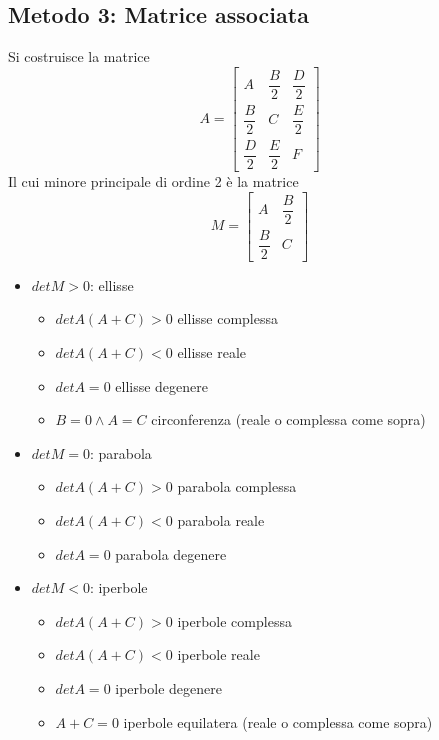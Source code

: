 \documentclass{article}
\begin{document}
\subsection*{Metodo 3: Matrice associata}
Si costruisce la matrice \[\renewcommand{\arraystretch}{2}A=\left[\begin{array}{ccc}
    A & \dfrac{B}{2} & \dfrac{D}{2}\\
    \dfrac{B}{2} & C & \dfrac{E}{2} \\
    \dfrac{D}{2} & \dfrac{E}{2} & F
\end{array}\right]\]
Il cui minore principale di ordine 2 è la matrice 
\[\renewcommand{\arraystretch}{2}M=\left[\begin{array}{cc}
    A & \dfrac{B}{2} \\
    \dfrac{B}{2} & C
\end{array}\right]\]
\begin{itemize}
    \item $detM>0$: ellisse
        \begin{itemize}
            \item $detA(A+C)>0$ ellisse complessa
            \item $detA(A+C)<0$ ellisse reale
            \item $detA=0$ ellisse degenere
            \item $B=0 \land A=C$ circonferenza (reale o complessa come sopra)
        \end{itemize}
    \item $detM=0$: parabola
        \begin{itemize}
            \item $detA(A+C)>0$ parabola complessa
            \item $detA(A+C)<0$ parabola reale
            \item $detA=0$ parabola degenere
        \end{itemize}
    \item $detM<0$: iperbole
    \begin{itemize}
            \item $detA(A+C)>0$ iperbole complessa
            \item $detA(A+C)<0$ iperbole reale
            \item $detA=0$ iperbole degenere
            \item $A+C=0$ iperbole equilatera (reale o complessa come sopra)
        \end{itemize}
\end{itemize}
\end{document}
